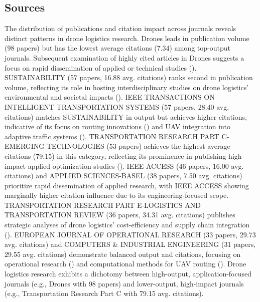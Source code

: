 \documentclass{article}
\begin{document}
\subsection{Sources}
The distribution of publications and citation impact across journals reveals distinct patterns in drone logistics research. Drones leads in publication volume (98 papers) but has the lowest average citations (7.34) among top-output journals. Subsequent examination of highly cited articles in Drones suggests a focus on rapid dissemination of applied or technical studies (\cite{WOS:000682822500001, WOS:000682822500021}). SUSTAINABILITY (57 papers, 16.88 avg. citations) ranks second in publication volume, reflecting its role in hosting interdisciplinary studies on drone logistics' environmental and societal impacts (\cite{WOS:000531558100214, WOS:000428567100315}). IEEE TRANSACTIONS ON INTELLIGENT TRANSPORTATION SYSTEMS (57 papers, 28.40 avg. citations) matches SUSTAINABILITY in output but achieves higher citations, indicative of its focus on routing innovations (\cite{WOS:000658360600026}) and UAV integration into adaptive traffic systems (\cite{WOS:000684003100038}). TRANSPORTATION RESEARCH PART C-EMERGING TECHNOLOGIES (53 papers) achieves the highest average citations (79.15) in this category, reflecting its prominence in publishing high-impact applied optimization studies (\cite{WOS:000353871700006, WOS:000425566000035}). IEEE ACCESS (46 papers, 16.00 avg. citations) and APPLIED SCIENCES-BASEL (38 papers, 7.50 avg. citations) prioritize rapid dissemination of applied research, with IEEE ACCESS showing marginally higher citation influence due to its engineering-focused scope. TRANSPORTATION RESEARCH PART E-LOGISTICS AND TRANSPORTATION REVIEW (36 papers, 34.31 avg. citations) publishes strategic analyses of drone logistics' cost-efficiency and supply chain integration (\cite{WOS:000488423300001}). EUROPEAN JOURNAL OF OPERATIONAL RESEARCH (33 papers, 29.73 avg. citations) and COMPUTERS \& INDUSTRIAL ENGINEERING (31 papers, 29.55 avg. citations) demonstrate balanced output and citations, focusing on operational research (\cite{WOS:000742554100008}) and computational methods for UAV routing (\cite{WOS:000460496000002}). Drone logistics research exhibits a dichotomy between high-output, application-focused journals (e.g., Drones with 98 papers) and lower-output, high-impact journals (e.g., Transportation Research Part C with 79.15 avg. citations).
\end{document}

